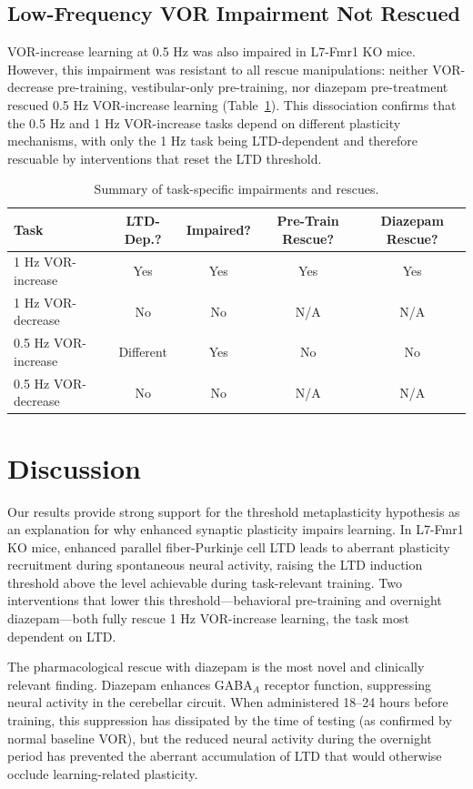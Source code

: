 \documentclass[11pt]{article}
\begin{document}
\subsection{Low-Frequency VOR Impairment Not Rescued}

VOR-increase learning at 0.5 Hz was also impaired in L7-Fmr1 KO mice. However, this impairment was resistant to all rescue manipulations: neither VOR-decrease pre-training, vestibular-only pre-training, nor diazepam pre-treatment rescued 0.5 Hz VOR-increase learning (Table~\ref{tab:lowfreq}). This dissociation confirms that the 0.5 Hz and 1 Hz VOR-increase tasks depend on different plasticity mechanisms, with only the 1 Hz task being LTD-dependent and therefore rescuable by interventions that reset the LTD threshold.

\begin{table}[h]
\centering
\caption{Summary of task-specific impairments and rescues.}
\label{tab:lowfreq}
\begin{tabular}{lcccc}
\toprule
Task & LTD-Dep.? & Impaired? & Pre-Train Rescue? & Diazepam Rescue? \\
\midrule
1 Hz VOR-increase & Yes & Yes & Yes & Yes \\
1 Hz VOR-decrease & No & No & N/A & N/A \\
0.5 Hz VOR-increase & Different & Yes & No & No \\
0.5 Hz VOR-decrease & No & No & N/A & N/A \\
\bottomrule
\end{tabular}
\end{table}

\section{Discussion}

Our results provide strong support for the threshold metaplasticity hypothesis as an explanation for why enhanced synaptic plasticity impairs learning. In L7-Fmr1 KO mice, enhanced parallel fiber-Purkinje cell LTD leads to aberrant plasticity recruitment during spontaneous neural activity, raising the LTD induction threshold above the level achievable during task-relevant training. Two interventions that lower this threshold---behavioral pre-training and overnight diazepam---both fully rescue 1 Hz VOR-increase learning, the task most dependent on LTD.

The pharmacological rescue with diazepam is the most novel and clinically relevant finding. Diazepam enhances GABA$_A$ receptor function, suppressing neural activity in the cerebellar circuit. When administered 18--24 hours before training, this suppression has dissipated by the time of testing (as confirmed by normal baseline VOR), but the reduced neural activity during the overnight period has prevented the aberrant accumulation of LTD that would otherwise occlude learning-related plasticity.
\end{document}
